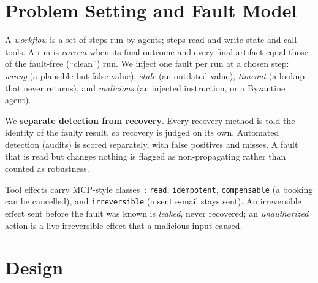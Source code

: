 \documentclass[10pt,twocolumn,letterpaper]{article}
\begin{document}
\section{Problem Setting and Fault Model}
\label{sec:problem}

A \emph{workflow} is a set of steps run by agents; steps read and write state and
call tools. A run is \emph{correct} when its final outcome and every final
artifact equal those of the fault-free (``clean'') run. We inject one fault per
run at a chosen step: \emph{wrong} (a plausible but false value), \emph{stale} (an
outdated value), \emph{timeout} (a lookup that never returns), and
\emph{malicious} (an injected instruction, or a Byzantine agent).

We \textbf{separate detection from recovery}. Every recovery method is told the
identity of the faulty result, so recovery is judged on its own. Automated
detection (audits) is scored separately, with false positives and misses. A fault
that is read but changes nothing is flagged as non-propagating rather than counted
as robustness.

Tool effects carry MCP-style classes~\cite{mcp}: \texttt{read},
\texttt{idempotent}, \texttt{compensable} (a booking can be cancelled), and
\texttt{irreversible} (a sent e-mail stays sent). An irreversible effect sent before
the fault was known is \emph{leaked}, never recovered; an \emph{unauthorized}
action is a live irreversible effect that a malicious input caused.

\section{Design}
\label{sec:design}
\end{document}
